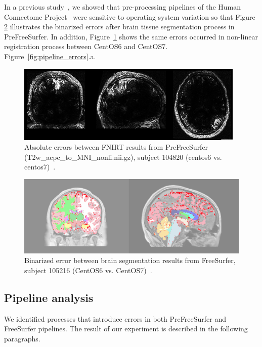 \documentclass{article}
\begin{document}
{In a previous study~\cite{Scaria2017}, we showed that pre-processing 
pipelines of the Human Connectome Project~\cite{Glasser2013} were 
sensitive to operating system variation so that Figure 
\ref{fig:tissue_class} illustrates the binarized errors after brain tissue 
segmentation process in PreFreeSurfer. In addition, 
Figure~\ref{fig:fnirt_result} shows the same errors occurred in 
non-linear registration process between CentOS6 and CentOS7. 
Figure~\ref{fig:pipeline_errors}.a.


\begin{figure}[H]
\centering
  \includegraphics[scale=0.6]{images/fnirt_result.png} 
  \caption{Absolute errors between FNIRT results from PreFreeSurfer 
  (T2w\_acpc\_to\_MNI\_nonli.nii.gz), subject 104820 (centos6 vs. 
  centos7)~\cite{Scaria2017}. } 
  \label{fig:fnirt_result}
\end{figure}

\begin{figure}[H]
\centering
  \includegraphics[scale=0.18]{images/brain_classification.png} 
  \caption{Binarized error between brain segmentation results from 
  FreeSurfer, subject 105216 (CentOS6 vs. CentOS7)~\cite{Scaria2017}.
    } 
  \label{fig:tissue_class}
\end{figure}

\subsection{Pipeline analysis}

We identified processes that introduce errors in both PreFreeSurfer and 
FreeSurfer pipelines. The result of our experiment is described in the 
following paragraphs.

}
\end{document}
